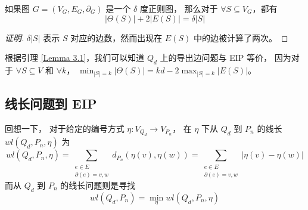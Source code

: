 \begin{lemma}
\label{Lemma 3.1}
如果图 $G = (V_G, E_G, \partial_G)$ 是一个 $\delta$ 度正则图，
那么对于 $\forall S \subseteq V_G$，都有
\begin{equation}
|\Theta(S)| + 2 |E(S)| = \delta |S|
\end{equation}
\end{lemma}

\begin{proof}[证明]
$\delta |S|$ 表示 $S$ 对应的边数，然而出现在 $E(S)$ 中的边被计算了两次。
\end{proof}

根据引理 \ref{Lemma 3.1}，我们可以知道 $Q_d$ 上的导出边问题与 EIP 等价，
因为对于 $\forall S \subseteq V$ 和 $\forall k$，
$\min_{|S| = k} |\Theta(S)| = k d − 2 \max_{|S| = k} |E(S)|$。

\subsection{线长问题到 EIP}
\label{Subsection 3.1.2}

回想一下，
对于给定的编号方式 $\eta \colon V_{Q_d} \rightarrow V_{P_n}$，
在 $\eta$ 下从 $Q_d$ 到 $P_n$ 的线长 $wl(Q_d, P_n, \eta)$ 为
\begin{equation}
wl(Q_d, P_n, \eta) = \sum_{\substack{
	e \in E \\
	\partial(e) = {v, w}
}} d_{P_n}(\eta(v), \eta(w)) = \sum_{\substack{
	e \in E \\
	\partial(e) = {v, w}
}} |\eta(v) - \eta(w)|
\end{equation}
而从 $Q_d$ 到 $P_n$ 的线长问题则是寻找
\begin{equation}
wl(Q_d, P_n) = \min_\eta wl(Q_d, P_n, \eta)
\end{equation}

